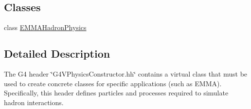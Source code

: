 \subsection*{Classes}
\begin{DoxyCompactItemize}
\item 
class \hyperlink{classEMMAHadronPhysics}{E\-M\-M\-A\-Hadron\-Physics}
\end{DoxyCompactItemize}


\subsection{Detailed Description}
The G4 header \char`\"{}\-G4\-V\-Physics\-Constructor.\-hh\char`\"{} contains a virtual class that must be used to create concrete classes for specific applications (such as E\-M\-M\-A). Specifically, this header defines particles and processes required to simulate hadron interactions. 